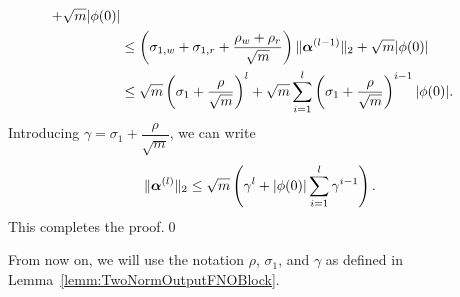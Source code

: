 \begin{lemm}
\begin{align}
    +
    \sqrt{m}|\phi (0)|\\
    &\leq \left( \sigma_{1,w} + \sigma_{1,r} + \frac{\rho_w + \rho_r}{\sqrt{m}}\right) \| \boldsymbol{\alpha}^{(l-1)}\|_2
    +
    \sqrt{m}|\phi (0)|\\
    &\leq \sqrt{m}\left(\sigma_1
    +
    \frac{\rho}{\sqrt{m}}\right)^{l}
    +\sqrt{m} \sum_{i=1}^{l}
    \left(\sigma_{1}
        +
        \frac{\rho}{\sqrt{m}}\right)^{i-1}|\phi(0)|.
\end{align}
Introducing $\gamma = \sigma_1 + \dfrac{\rho}{\sqrt{m}}$, we can write
\begin{equation}
    \|\boldsymbol{\alpha}^{(l)}\|_2 \leq \sqrt{m}\left(\gamma^l+|\phi(0)| \sum_{i=1}^{l} \gamma^{i-1}\right).
    \label{eq:alpha_l_2_norm_bound}
\end{equation}
This completes the proof.\hfill \qed
\end{lemm}

From now on, we will use the notation $\rho$, $\sigma_1$, and $\gamma$ as defined in Lemma~\ref{lemm:TwoNormOutputFNOBlock}.

